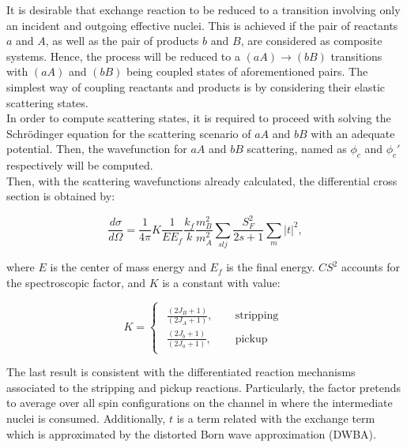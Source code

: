 \documentclass[openany]{book}
\begin{document}
It is desirable that exchange reaction to be reduced to a transition involving only an incident and outgoing effective nuclei. This is achieved if the pair of reactants $a$ and $A$, as well as the pair of products $b$ and $B$, are considered as composite systems. Hence, the process will be reduced to a $(aA) \rightarrow (bB)$ transitions with $(aA)$ and $(bB)$ being coupled states of aforementioned pairs. The simplest way of coupling reactants and products is by considering their elastic scattering states. \\

In order to compute scattering states, it is required to proceed with solving the Schrödinger equation for the scattering scenario of $aA$ and $bB$ with an adequate potential. Then, the wavefunction for $aA$ and $bB$ scattering, named as  $\phi_c$ and $\phi_c'$ respectively will be computed. \\

Then, with the scattering wavefunctions already calculated, the differential cross section is obtained by:

\begin{equation} \label{eq:exchange_differential}
	\frac{d\sigma}{d\Omega} = \frac{1}{4\pi} K \frac{1}{E E_f} \frac{k_f}{k}\frac{m^2_B}{m^2_A} \sum_{slj} { \frac{S^2_F}{2s + 1}\sum_{m} |t|^2},
\end{equation}

where $E$ is the center of mass energy and $E_f$ is the final energy.  $CS^2$ accounts for the spectroscopic factor, and $K$ is a constant with value:

\begin{equation} \label{eq:exchange_constant}
	K = 	\left\{\begin{array}{l}
		\begin{split}
			\frac{(2J_B + 1)}{(2J_A + 1)}, \quad &\mathrm{\ stripping} \\ 
			\frac{(2J_b + 1)}{(2J_a + 1)}, \quad &\mathrm{\ pickup}
		\end{split}
	\end{array}\right.
\end{equation}

The last result is consistent with the differentiated reaction mechanisms associated to the stripping and pickup reactions. Particularly, the factor pretends to average over all spin configurations on the channel in where the intermediate nuclei is consumed.  Additionally, $t$ is a term related with the exchange term which is approximated by the distorted Born wave approximation (DWBA). \\
\end{document}
